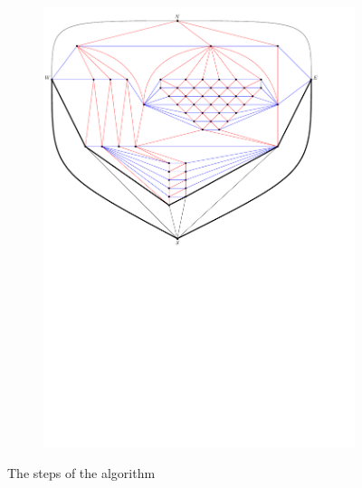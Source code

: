 \begin{figure}
\begin{subfigure}[b]{.9 \textwidth}
      \includegraphics[width=\textwidth]{examples/img/vertWorstCase/sweep8}
      \caption{}
      \label{fig:ex:vert:sweep8}
    \end{subfigure}
  \caption{The steps of the algorithm}
  \label{}

\end{figure}



